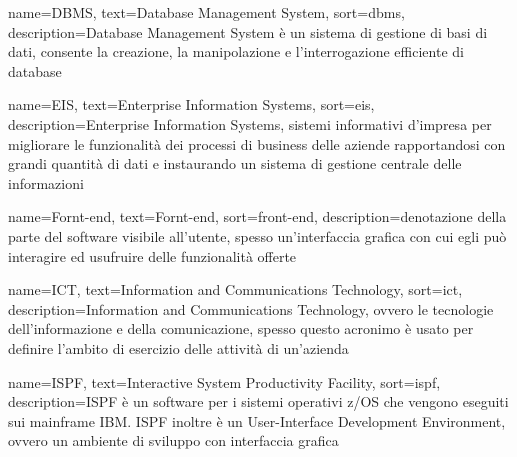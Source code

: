 {
    name=DBMS,
    text=Database Management System,
    sort=dbms,
    description={Database Management System è un sistema di gestione di basi di dati, consente la creazione, la manipolazione e l'interrogazione efficiente di database}
}

{
    name=EIS,
    text=Enterprise Information Systems,
    sort=eis,
    description={Enterprise Information Systems, sistemi informativi d'impresa per migliorare le funzionalità dei processi di business delle aziende rapportandosi con grandi quantità di dati e instaurando un sistema di gestione centrale delle informazioni}
}

{
    name=Fornt-end,
    text=Fornt-end,
    sort=front-end,
    description={denotazione della parte del software visibile all'utente, spesso un'interfaccia grafica con cui egli può interagire ed usufruire delle funzionalità offerte}
}



{
    name=ICT,
    text=Information and Communications Technology,
    sort=ict,
    description={Information and Communications Technology, ovvero le tecnologie dell’informazione e della comunicazione, spesso questo acronimo è usato per definire l'ambito di esercizio delle attività di un'azienda}
}

{
    name=ISPF,
    text=Interactive System Productivity Facility,
    sort=ispf,
    description={ISPF è un software per i sistemi operativi z/OS che vengono eseguiti sui mainframe IBM. ISPF inoltre è un User-Interface Development Environment, ovvero un ambiente di sviluppo con interfaccia grafica}
}



